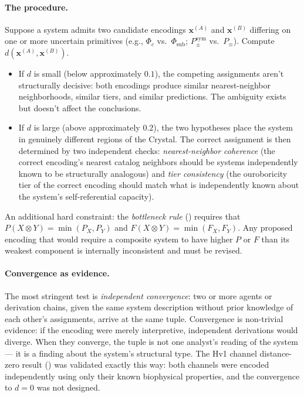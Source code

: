 \documentclass[12pt,a4paper]{article}
\newcommand{\Ppms}{P_{\pm}^{\text{sym}}}
\begin{document}
\paragraph{The procedure.}
Suppose a system admits two candidate encodings $\mathbf{x}^{(A)}$
and $\mathbf{x}^{(B)}$ differing on one or more uncertain primitives
(e.g., $\Phi_c$ vs.\ $\Phi_\text{sub}$; $\Ppms$ vs.\ $P_\equiv$).
Compute $d(\mathbf{x}^{(A)}, \mathbf{x}^{(B)})$.
\begin{itemize}[noitemsep]
\item If $d$ is small (below approximately $0.1$), the competing
assignments aren't structurally decisive: both encodings produce
similar nearest-neighbor neighborhoods, similar tiers, and similar
predictions. The ambiguity exists but doesn't affect the conclusions.

\item If $d$ is large (above approximately $0.2$), the two hypotheses
place the system in genuinely different regions of the Crystal. The
correct assignment is then determined by two independent checks:
\emph{nearest-neighbor coherence} (the correct encoding's nearest
catalog neighbors should be systems independently known to be
structurally analogous) and \emph{tier consistency} (the
ouroboricity tier of the correct encoding should match what is
independently known about the system's self-referential capacity).
\end{itemize}

An additional hard constraint: the \emph{bottleneck rule}
() requires that $P(X \otimes Y) =
\min(P_X, P_Y)$ and $F(X \otimes Y) = \min(F_X, F_Y)$. Any
proposed encoding that would require a composite system to have
higher $P$ or $F$ than its weakest component is internally
inconsistent and must be revised.

\paragraph{Convergence as evidence.}
The most stringent test is \emph{independent convergence}: two or
more agents or derivation chains, given the same system description
without prior knowledge of each other's assignments, arrive at the
same tuple. Convergence is non-trivial evidence: if the encoding were
merely interpretive, independent derivations would diverge. When they
converge, the tuple is not one analyst's reading of the system --- it
is a finding about the system's structural type. The Hv1 channel
distance-zero result () was validated exactly this way:
both channels were encoded independently using only their known
biophysical properties, and the convergence to $d = 0$ was not
designed.
\end{document}

